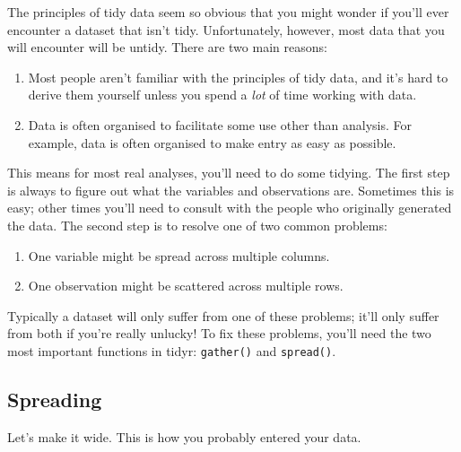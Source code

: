 \documentclass[
]{book}
\begin{document}
The principles of tidy data seem so obvious that you might wonder if you'll ever encounter a dataset that isn't tidy. Unfortunately, however, most data that you will encounter will be untidy. There are two main reasons:

\begin{enumerate}
\def\labelenumi{\arabic{enumi}.}
\item
  Most people aren't familiar with the principles of tidy data, and it's hard
  to derive them yourself unless you spend a \emph{lot} of time working with data.
\item
  Data is often organised to facilitate some use other than analysis. For
  example, data is often organised to make entry as easy as possible.
\end{enumerate}

This means for most real analyses, you'll need to do some tidying. The first step is always to figure out what the variables and observations are. Sometimes this is easy; other times you'll need to consult with the people who originally generated the data.
The second step is to resolve one of two common problems:

\begin{enumerate}
\def\labelenumi{\arabic{enumi}.}
\item
  One variable might be spread across multiple columns.
\item
  One observation might be scattered across multiple rows.
\end{enumerate}

Typically a dataset will only suffer from one of these problems; it'll only suffer from both if you're really unlucky! To fix these problems, you'll need the two most important functions in tidyr: \texttt{gather()} and \texttt{spread()}.

\hypertarget{spreading}{%
\subsection*{Spreading}\label{spreading}}

Let's make it wide. This is how you probably entered your data.
\end{document}
